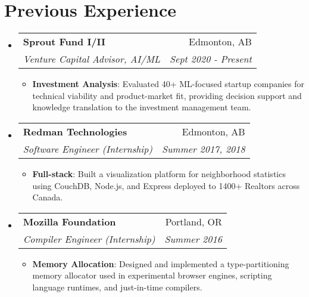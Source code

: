\documentclass[letterpaper,11pt]{article}
\makeatletter
\newcommand{\resumeItem}[2]{
  \item\small{
    \textbf{#1}{: #2 \vspace{-2pt}}
  }
}
\newcommand{\resumeSubheading}[4]{
  \vspace{-1pt}\item
    \begin{tabular*}{0.97\textwidth}[t]{l@{\extracolsep{\fill}}r}
      \textbf{#1} & #2 \\
      \textit{\small#3} & \textit{\small #4} \\
    \end{tabular*}\vspace{-5pt}
}
\newcommand{\resumeSubHeadingListStart}{\begin{itemize}[leftmargin=*]}
\newcommand{\resumeSubHeadingListEnd}{\end{itemize}}
\newcommand{\resumeItemListStart}{\begin{itemize}}
\newcommand{\resumeItemListEnd}{\end{itemize}\vspace{-5pt}}
\makeatother
\begin{document}
\section{Previous Experience}
  \resumeSubHeadingListStart
    \resumeSubheading
      {Sprout Fund I/II}{Edmonton, AB}
      {Venture Capital Advisor, AI/ML}{Sept 2020 - Present}
      \resumeItemListStart
        \resumeItem{Investment Analysis}
          {Evaluated 40+ ML-focused startup companies for technical viability and product-market fit, providing decision support and knowledge translation to the investment management team.}
      \resumeItemListEnd

    \resumeSubheading
      {Redman Technologies}{Edmonton, AB}
      {Software Engineer (Internship)}{Summer 2017, 2018}
      \resumeItemListStart
        \resumeItem{Full-stack}
          {Built a visualization platform for neighborhood statistics using CouchDB, Node.js, and Express deployed to 1400+ Realtors across Canada.}
      \resumeItemListEnd

    \resumeSubheading
      {Mozilla Foundation}{Portland, OR}
      {Compiler Engineer (Internship)}{Summer 2016}
      \resumeItemListStart
        \resumeItem{Memory Allocation}
          {Designed and implemented a type-partitioning memory allocator used in experimental browser engines, scripting language runtimes, and just-in-time compilers.}
      \resumeItemListEnd

  \resumeSubHeadingListEnd


\end{document}
